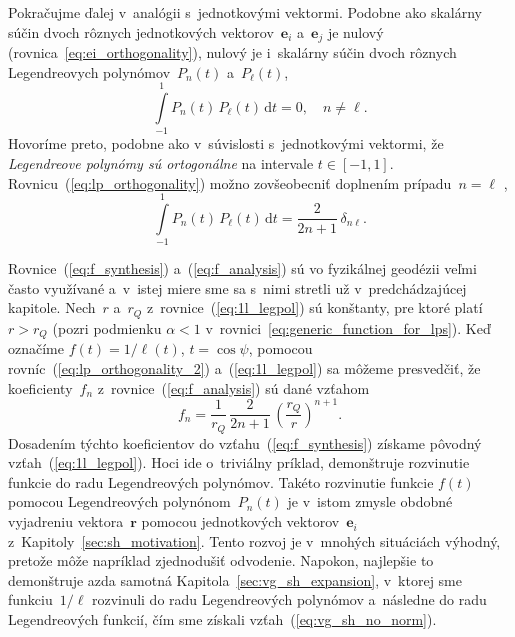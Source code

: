 \documentclass[a4paper,12pt]{book}
\newcommand{\diff}{\mathrm d}
\let\vec\mathbf
\begin{document}
Pokračujme ďalej v~analógii s~jednotkovými vektormi.  Podobne ako skalárny 
súčin dvoch rôznych jednotkových vektorov~$\vec e_i$ a~$ \vec e_j$ je nulový 
(rovnica~\ref{eq:ei_orthogonality}), nulový je i~skalárny súčin dvoch rôznych 
Legendreovych polynómov~$P_n(t)$ a~$P_\ell(t)$,
%
\begin{equation}
\label{eq:lp_orthogonality}
\int\limits_{-1}^1 P_n(t) \, P_\ell(t) \, \diff t = 0{,} \quad n \neq \ell{.}
\end{equation}
%
Hovoríme preto, podobne ako v~súvislosti s~jednotkovými vektormi, že
\emph{Legendreove polynómy sú ortogonálne} na intervale $t \in [-1, 1].$
Rovnicu~(\ref{eq:lp_orthogonality}) možno zovšeobecniť doplnením prípadu~$n
= \ell$ \parencite[napríklad][]{Hobson},
%
\begin{equation}
\label{eq:lp_orthogonality_2}
\int\limits_{-1}^1 P_n(t) \, P_\ell(t) \, \diff t = \frac{2}{2n + 1} \, 
\delta_{n\ell}{.}
\end{equation}

Rovnice~(\ref{eq:f_synthesis}) a~(\ref{eq:f_analysis}) sú vo fyzikálnej
geodézii veľmi často využívané a~v~istej miere sme sa s~nimi stretli už
v~predchádzajúcej kapitole.  Nech~$r$ a~$r_Q$ z~rovnice~(\ref{eq:1l_legpol}) sú 
konštanty, pre ktoré platí~$r > r_Q$ (pozri podmienku
$\alpha < 1$ v~rovnici~\ref{eq:generic_function_for_lps}).  Keď označíme $f(t)
= 1 \slash \ell(t)$, $t = \cos\psi$, pomocou 
rovníc~(\ref{eq:lp_orthogonality_2})
a~(\ref{eq:1l_legpol}) sa môžeme presvedčiť, že koeficienty~$f_n$
z~rovnice~(\ref{eq:f_analysis}) sú dané vzťahom
%
\begin{equation}
f_n = \frac{1}{r_Q} \, \frac{2}{2n + 1} \, \left( \frac{r_Q}{r} \right)^{n
+ 1}{.}
\end{equation}
%
Dosadením týchto koeficientov do vzťahu~(\ref{eq:f_synthesis}) získame pôvodný 
vzťah~(\ref{eq:1l_legpol}).  Hoci ide o~triviálny príklad, demonštruje 
rozvinutie funkcie do radu Legendreových polynómov.  Takéto rozvinutie funkcie 
$f(t)$ pomocou Legendreových polynónom~$P_n(t)$ je v~istom zmysle obdobné 
vyjadreniu vektora~$\vec r$ pomocou jednotkových vektorov~$\vec e_i$ 
z~Kapitoly~\ref{sec:sh_motivation}.  Tento rozvoj je v~mnohých situáciách 
výhodný, pretože môže napríklad zjednodušiť odvodenie.  Napokon, najlepšie to 
demonštruje azda samotná Kapitola~\ref{sec:vg_sh_expansion}, v~ktorej sme 
funkciu~$1 \slash \ell$ rozvinuli do radu Legendreových polynómov a~následne do 
radu Legendreových funkcií, čím sme získali vzťah~(\ref{eq:vg_sh_no_norm}).
\end{document}
